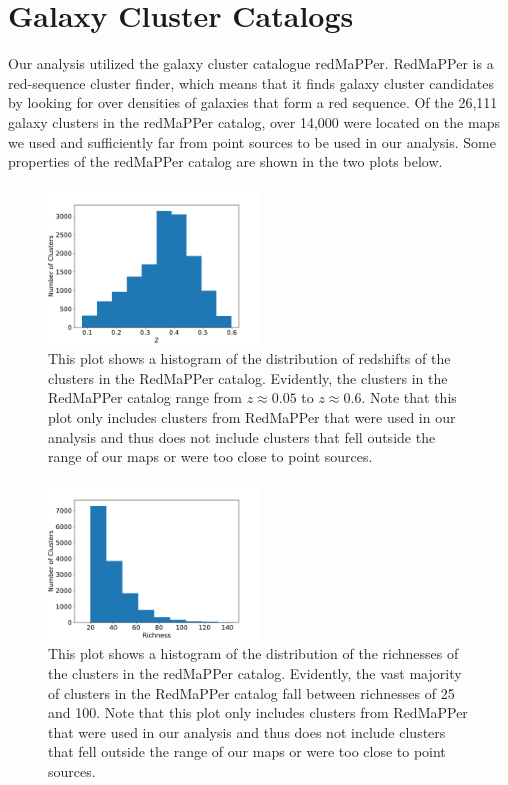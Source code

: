 \documentclass{princeton_astro_thesis}
\begin{document}
\section{Galaxy Cluster Catalogs}
Our analysis utilized the galaxy cluster catalogue redMaPPer. RedMaPPer is a red-sequence cluster finder, which means that it finds galaxy cluster candidates by looking for over densities of galaxies that form a red sequence. Of the 26,111 galaxy clusters in the redMaPPer catalog, over 14,000 were located on the maps we used and sufficiently far from point sources to be used in our analysis. Some properties of the redMaPPer catalog are shown in the two plots below.
\begin{figure}[h]
\centering
\includegraphics[width=0.5\textwidth]{../redmapper_z_hist.pdf}
\caption{This plot shows a histogram of the distribution of redshifts of the clusters in the RedMaPPer catalog. Evidently, the clusters in the RedMaPPer catalog range from $z\approx0.05$ to $z\approx0.6$. Note that this plot only includes clusters from RedMaPPer that were used in our analysis and thus does not include clusters that fell outside the range of our maps or were too close to point sources. }
\end{figure}

\begin{figure}[h]
\centering
\includegraphics[width=0.5\textwidth]{../redmapper_richness_hist.pdf}
\caption{This plot shows a histogram of the distribution of the richnesses of the clusters in the redMaPPer catalog. Evidently, the vast majority of clusters in the RedMaPPer catalog fall between richnesses of 25 and 100. Note that this plot only includes clusters from RedMaPPer that were used in our analysis and thus does not include clusters that fell outside the range of our maps or were too close to point sources. }
\end{figure}
\end{document}
